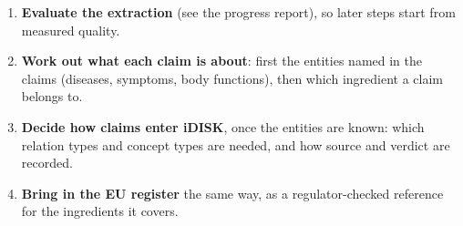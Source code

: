 \documentclass[10pt,a4paper]{article}
\begin{document}
\begin{enumerate}
  \item \textbf{Evaluate the extraction} (see the progress report), so later steps start from
        measured quality.
  \item \textbf{Work out what each claim is about}: first the entities named in the claims (diseases,
        symptoms, body functions), then which ingredient a claim belongs to.
  \item \textbf{Decide how claims enter iDISK}, once the entities are known: which relation types and
        concept types are needed, and how source and verdict are recorded.
  \item \textbf{Bring in the EU register} the same way, as a regulator-checked reference for the
        ingredients it covers.
\end{enumerate}
\end{document}
